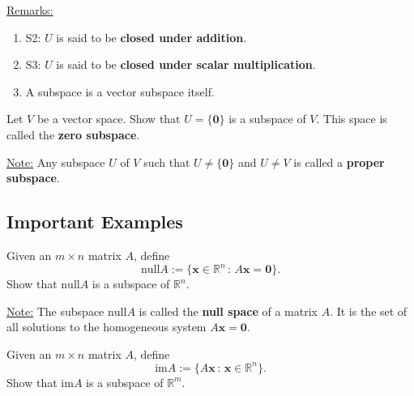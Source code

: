 \documentclass[20pt,a4paper]{extarticle}
\newcounter{example}
\begin{document}
\underline{Remarks:}
	\begin{enumerate}[label=\Circled{\arabic*}]
		\item S2: $U$ is said to be \textbf{closed under addition}.
		\item S3: $U$ is said to be \textbf{closed under scalar multiplication}.
		\item A subspace is a vector subspace itself.
	\end{enumerate}


\begin{example}
Let $V$ be a vector space. Show that $U = \{ \mathbf{0} \}$ is a subspace of $V$. This space is called the \textbf{zero subspace}.
\end{example}

\begin{solution}

\end{solution}

\vfill 

\underline{Note:} Any subspace $U$ of $V$ such that $U \neq \{ \mathbf{0} \}$ and $U \neq V$ is called a \textbf{proper subspace}. 

\newpage 

\subsection{Important Examples}

\begin{example}
Given an $m \times n$ matrix $A$, define 
	$$ 
		\mathrm{null} A := \{ \mathbf{x} \in \mathbb{R}^n \, : \, A \mathbf{x} = \mathbf{0} \} .
	$$
Show that $\mathrm{null} A$ is a subspace of $\mathbb{R}^n$. 
\end{example}

\begin{solution}

\end{solution}

\vfill 

\underline{Note:} The subspace $\mathrm{null} A$ is called the \textbf{null space} of a matrix $A$. It is the set of all solutions to the homogeneous system $A \mathbf{x} = \mathbf{0}$. 

\newpage 

\begin{example}
Given an $m \times n$ matrix $A$, define
	\[
		\mathrm{im} A := \{ A \mathbf{x} \, : \, \mathbf{x} \in \mathbb{R}^n \} .
	\]
Show that $\mathrm{im} A$ is a subspace of $\mathbb{R}^m$. 
\end{example}
\end{document}
